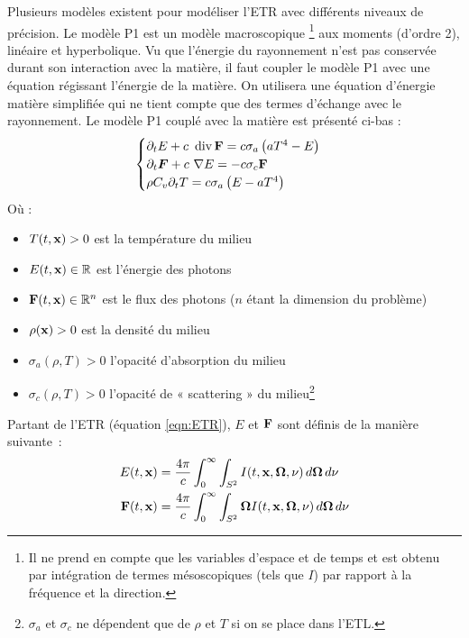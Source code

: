 Plusieurs modèles existent pour modéliser l'ETR avec différents niveaux de précision. Le modèle P1 est un modèle macroscopique \footnote{Il ne prend en compte que les variables d'espace et de temps et est obtenu par intégration de termes mésoscopiques (tels que $I$) par rapport à la fréquence et la direction.} aux moments (d'ordre 2), linéaire et hyperbolique. Vu que l'énergie du rayonnement n'est pas conservée durant son interaction avec la matière, il faut coupler le modèle P1 avec une équation régissant l'énergie de la matière. On utilisera une équation d'énergie matière simplifiée qui ne tient compte que des termes d'échange avec le rayonnement. Le modèle P1 couplé avec la matière est présenté ci-bas \parencite{Reference2} :
\begingroup
\large
\begin{equation}
    \begin{cases}
     \partial_tE + c \ \operatorname {div} \mathbf{F} = c\sigma_a\left(aT^4-E\right)\\
     \partial_t\bm{F} + c \ \nabla E = -c\sigma_c \mathbf{F} \\
     \rho C_v \partial_t T = c \sigma_a \left(E-aT^4\right)
    \end{cases}
\label{eqn:P1}
\end{equation}
\endgroup
Où :
\begin{itemize}
    \item $T(t,\mathbf{x}) > 0$ est la température du milieu 
    \item $E(t,\mathbf{x}) \in \mathbb{R}$ est l'énergie des photons
    \item $\mathbf{F}(t,\mathbf{x}) \in \mathbb{R}^n $ est le flux des photons ($n$ étant la dimension du problème)
    \item $\rho(\mathbf{x}) > 0$ est la densité du milieu
    \item $\sigma_a(\rho, T) > 0$ l'opacité d'absorption du milieu
    \item $\sigma_c(\rho, T) > 0$ l'opacité de « scattering » du milieu\footnote{$\sigma_a$ et $\sigma_c$ ne dépendent que de $\rho$ et $T$ si on se place dans l'ETL.}
\end{itemize}

Partant de l'ETR (équation \ref{eqn:ETR}), $E$ et $\mathbf{F}$ sont définis de la manière suivante :
\begin{align*}
E(t,\mathbf{x}) &= \frac{4\pi}{c} \int_{0}^{\infty} \int_{S^2} I(t,\mathbf{x},\bm{\Omega},\nu) \, d\bm{\Omega} \, d\nu \\
\mathbf{F}(t,\mathbf{x}) &= \frac{4\pi}{c} \int_{0}^{\infty} \int_{S^2} \bm{\Omega}I(t,\mathbf{x},\bm{\Omega},\nu) \, d\bm{\Omega} \, d\nu 
\label{eqn:EFT}
\end{align*}

